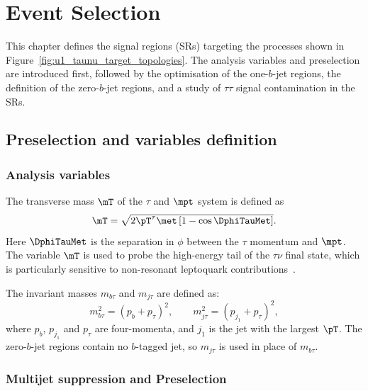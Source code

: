 \chapter{Event Selection}
\label{chapter:event_selection}

This chapter defines the signal regions (SRs) targeting the processes shown in Figure~\ref{fig:u1_taunu_target_topologies}.
The analysis variables and preselection are introduced first, followed by the optimisation of the one-$b$-jet regions, the definition of the zero-$b$-jet regions, and a study of $\tau\tau$ signal contamination in the SRs.

\section{Preselection and variables definition}
\label{sec:ch7_preselection}

\subsection{Analysis variables}
\label{subsec:ch7_variables}

The transverse mass $\mT$ of the $\tau$ and $\mpt$ system is defined as
    \begin{equation}
        \mT = \sqrt{2\pT^\tau\met\left[1-\cos\DphiTauMet\right]}.
        \label{eq:ch7_mt}
    \end{equation}
Here $\DphiTauMet$ is the separation in $\phi$ between the $\tau$ momentum and $\mpt$.
The variable $\mT$ is used to probe the high-energy tail of the $\tau\nu$ final state, which is particularly sensitive to non-resonant leptoquark contributions~\cite{Endo2022NonResonant}.

The invariant masses $m_{b\tau}$ and $m_{j\tau}$ are defined as:
    \begin{equation}
        m_{b\tau}^{2} = (p_b+p_\tau)^2, \qquad m_{j\tau}^{2} = (p_{j_1}+p_\tau)^2,
        \label{eq:ch7_visible_masses}
    \end{equation}
    where $p_b$, $p_{j_1}$ and $p_\tau$ are four-momenta, and $j_1$ is the jet with the largest $\pT$.
The zero-$b$-jet regions contain no $b$-tagged jet, so $m_{j\tau}$ is used in place of $m_{b\tau}$.

\subsection{Multijet suppression and Preselection}
\label{subsec:ch7_multijet}

